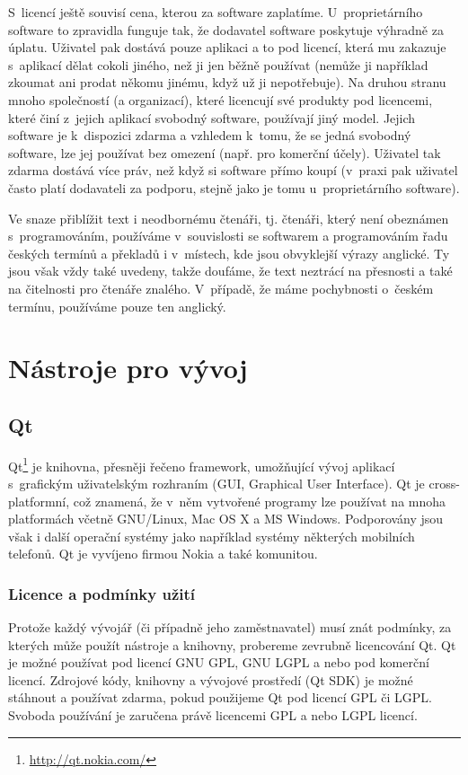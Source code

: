 \documentclass[a4paper,10pt]{article}
\begin{document}
S~licencí ještě souvisí cena, kterou za software zaplatíme.
U~proprietárního software to zpravidla funguje tak, že dodavatel software poskytuje výhradně za úplatu.
Uživatel pak dostává pouze aplikaci a to pod licencí, která mu zakazuje s~aplikací dělat cokoli jiného, než ji jen běžně používat (nemůže ji například zkoumat ani prodat někomu jinému, když už ji nepotřebuje).
Na druhou stranu mnoho společností (a organizací), které licencují své produkty pod licencemi, které činí z~jejich aplikací svobodný software, používají jiný model.
Jejich software je k~dispozici zdarma a vzhledem k~tomu, že se jedná svobodný software, lze jej používat bez omezení (např. pro komerční účely).
Uživatel tak zdarma dostává více práv, než když si software přímo koupí (v~praxi pak uživatel často platí dodavateli za podporu, stejně jako je tomu u~proprietárního software).

Ve snaze přiblížit text i neodbornému čtenáři, tj. čtenáři, který není obeznámen s~programováním, používáme v~souvislosti se softwarem a programováním řadu českých termínů a překladů i v~místech, kde jsou obvyklejší výrazy anglické.
Ty jsou však vždy také uvedeny, takže doufáme, že text neztrácí na přesnosti a také na čitelnosti pro čtenáře znalého.
V~případě, že máme pochybnosti o~českém termínu, používáme pouze ten anglický.

\section{Nástroje pro vývoj}

\subsection{Qt}
Qt\footnote{\url{http://qt.nokia.com/}} je knihovna, přesněji řečeno framework, umožňující vývoj aplikací s~grafickým uživatelským rozhraním (GUI, Graphical User Interface).
Qt je cross-platformní, což znamená, že v~něm vytvořené programy lze používat na mnoha platformách včetně GNU/Linux, Mac OS X a MS Windows.
Podporovány jsou však i další operační systémy jako například systémy některých mobilních telefonů.
Qt je vyvíjeno firmou Nokia a také komunitou.

\subsubsection{Licence a podmínky užití}
Protože každý vývojář (či případně jeho zaměstnavatel) musí znát podmínky, za kterých může použít nástroje a knihovny, probereme zevrubně licencování Qt.
Qt je možné používat pod licencí GNU GPL, GNU LGPL a nebo pod komerční licencí.
Zdrojové kódy, knihovny a vývojové prostředí (Qt SDK) je možné stáhnout a používat zdarma, pokud použijeme Qt pod licencí GPL či LGPL.
Svoboda používání je zaručena právě licencemi GPL a nebo LGPL licencí.
\end{document}
